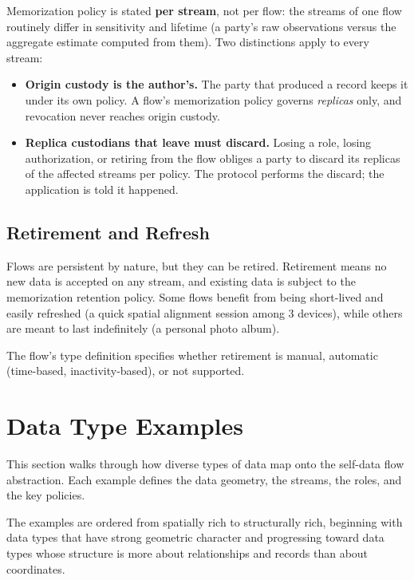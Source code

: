 \documentclass[11pt, letterpaper]{article}
\begin{document}
Memorization policy is stated \textbf{per stream}, not per flow: the streams of one
flow routinely differ in sensitivity and lifetime (a party's raw observations versus
the aggregate estimate computed from them). Two distinctions apply to every stream:

\begin{itemize}[leftmargin=2em]
  \item \textbf{Origin custody is the author's.} The party that produced a record keeps
    it under its own policy. A flow's memorization policy governs \emph{replicas} only,
    and revocation never reaches origin custody.
  \item \textbf{Replica custodians that leave must discard.} Losing a role, losing
    authorization, or retiring from the flow obliges a party to discard its replicas of
    the affected streams per policy. The protocol performs the discard; the application
    is told it happened.
\end{itemize}

\subsection{Retirement and Refresh}

Flows are persistent by nature, but they can be retired. Retirement means no new data
is accepted on any stream, and existing data is subject to the memorization retention
policy. Some flows benefit from being short-lived and easily refreshed (a quick spatial
alignment session among 3 devices), while others are meant to last indefinitely (a
personal photo album).

The flow's type definition specifies whether retirement is manual, automatic
(time-based, inactivity-based), or not supported.


\newpage
\section{Data Type Examples}
\label{sec:examples}

This section walks through how diverse types of data map onto the self-data flow
abstraction. Each example defines the data geometry, the streams, the roles, and the
key policies.

The examples are ordered from spatially rich to structurally rich, beginning with data
types that have strong geometric character and progressing toward data types whose
structure is more about relationships and records than about coordinates.
\end{document}
